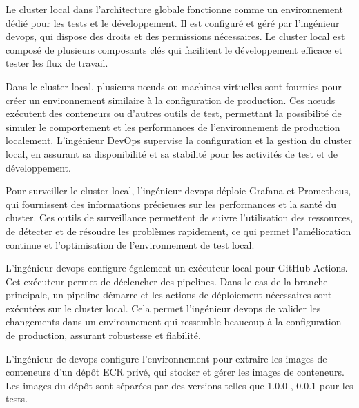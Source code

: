  Le cluster local dans l’architecture globale fonctionne comme un environnement dédié pour les tests et le développement. Il est configuré et géré par l'ingénieur devops, qui dispose des droits et des permissions nécessaires. Le cluster local est composé de plusieurs composants clés qui facilitent le développement efficace et tester les flux de travail.     \\[0.02cm]
 \indent
 Dans le cluster local, plusieurs nœuds ou machines virtuelles sont fournies pour créer un environnement similaire à la configuration de production. Ces nœuds exécutent des conteneurs ou d’autres outils de test, permettant la possibilité de simuler le comportement et les performances de l’environnement de production localement. L’ingénieur DevOps supervise la configuration et la gestion du cluster local, en assurant sa disponibilité et sa stabilité pour les activités de test et de développement.\\[0.02cm]
 \indent
 Pour surveiller le cluster local, l’ingénieur devops déploie Grafana et Prometheus, qui fournissent des informations précieuses sur les performances et la santé du cluster. Ces outils de surveillance permettent de suivre l’utilisation des ressources, de détecter et de résoudre les problèmes rapidement, ce qui permet l’amélioration continue et l’optimisation de l’environnement de test local.\\[0.02cm]
 \indent
 L’ingénieur devops configure également un exécuteur local pour GitHub Actions. Cet exécuteur permet de déclencher des pipelines. Dans le cas de la branche principale, un pipeline démarre et les actions de déploiement nécessaires sont exécutées sur le cluster local. Cela permet l'ingénieur devops de valider les changements dans un environnement qui ressemble beaucoup à la configuration de production, assurant robustesse et fiabilité.
 \\[0.02cm]
 \indent
L’ingénieur de devops configure l’environnement pour extraire les images de conteneurs d’un dépôt ECR privé, qui stocker et gérer les images de conteneurs. Les images du dépôt sont séparées par des versions telles que 1.0.0 , 0.0.1 pour les tests.
 
